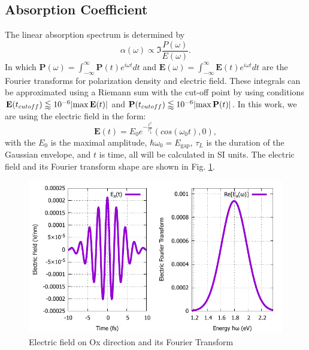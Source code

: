 \documentclass[12pt,english,a4paper]{article}
\begin{document}
\subsection{Absorption Coefficient}
\quad The linear absorption spectrum is determined by\cite{haug_quantum_2009}
\begin{equation}
	\alpha(\omega) \propto \Im{\frac{P(\omega)}{E(\omega)}}.
	\label{absorpt}
\end{equation}
\quad In which $\textbf{P}(\omega)= \int_{-\infty}^{\infty}\textbf{P}(t) e^{i\omega t} dt$ and $\textbf{E}(\omega) = \int_{-\infty}^{\infty}\textbf{E}(t) e^{i\omega t} dt$ are the Fourier transforms for polarization density and electric field. These integrals can be approximated using a Riemann sum with the cut-off point by using conditions $\textbf{E}(t_{cutoff}) \lessapprox 10^{-6} \abs{\max{\textbf{E}(t)}}$ and $\textbf{P}(t_{cutoff}) \lessapprox 10^{-6} \abs{\max{\textbf{P}(t)}}$. In this work, we are using the electric field in the form:
\begin{equation}
	\textbf{E}(t) = E_0 e^{-\frac{t^2}{\tau_L^2}}(cos(\omega_0t), 0),
\end{equation} 
with the $E_0$ is the maximal amplitude, $\hbar\omega_0 = E_{\mathrm{gap}}$, $\tau_L$ is the duration of the Gaussian envelope, and $t$ is time, all will be calculated in SI units. The electric field and its Fourier transform shape are shown in Fig. \ref{Et}.\\
\begin{figure}
	\begin{center}
\includegraphics[width = 0.75\linewidth]{Images/EAt.pdf}
\caption{Electric field on Ox direction and its Fourier Transform}
\label{Et}
	\end{center}
\end{figure}
\end{document}
